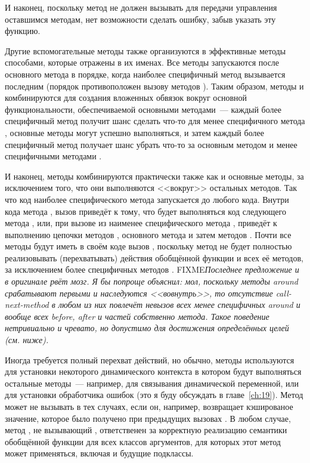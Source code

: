 И наконец, поскольку метод  не должен вызывать  для
передачи управления оставшимся методам, нет возможности сделать ошибку, забыв указать эту
функцию.

Другие вспомогательные методы также организуются в эффективные методы способами, которые
отражены в их именах.  Все методы  запускаются после основного метода в
порядке, когда наиболее специфичный метод вызывается последним (порядок противоположен
вызову методов ).  Таким образом, методы  и 
комбинируются для создания вложенных обвязок вокруг основной функциональности,
обеспечиваемой основными методами~--- каждый более специфичный метод  получит
шанс сделать что-то для менее специфичного метода , основные методы могут
успешно выполняться, и затем каждый более специфичный метод  получает шанс
убрать что-то за основным методом и менее специфичными методами .

И наконец, методы  комбинируются практически также как и основные методы, за
исключением того, что они выполняются <<вокруг>> остальных методов. Так что код наиболее
специфического метода  запускается до любого кода. Внутри кода метода
, вызов  приведёт к тому, что будет выполняться код
следующего метода , или, при вызове из наименее специфического метода
, приведёт к выполнению цепочки методов , основного метода и
затем методов .  Почти все методы  будут иметь в своём коде
вызов , поскольку метод  не будет полностью
реализовывать (перехватывать) действия обобщённой функции и всех её методов, за
исключением более специфичных методов . FIXME\textit{Последнее предложение и
  в оригинале рвёт мозг. Я бы попроще объяснил: мол, поскольку методы around срабатывают
  первыми и наследуются <<вовнутрь>>, то отсутствие call-next-method в любом из них повлечёт
  невызов всех менее специфичных around и вообще всех before, after и частей собственно
  метода. Такое поведение нетривиально и чревато, но допустимо для достижения определённых
  целей (см. ниже).}

Иногда требуется полный перехват действий, но обычно, методы  используются
для установки некоторого динамического контекста в котором будут выполняться остальные
методы~--- например, для связывания динамической переменной, или для установки обработчика
ошибок (это я буду обсуждать в главе~\ref{ch:19}).  Метод  может не вызывать
 в тех случаях, если он, например, возвращает кэшированое значение,
которое было получено при предыдущих вызовах .  В любом случае,
метод , не вызывающий , ответственен за корректную
реализацию семантики обобщённой функции для всех классов аргументов, для которых этот
метод может применяться, включая и будущие подклассы.

